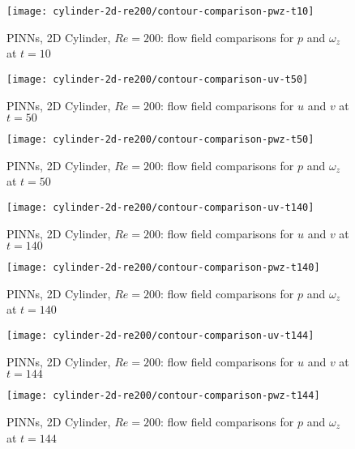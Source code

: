 \begin{figure}[hbt!]
    \texttt{[image: cylinder-2d-re200/contour-comparison-pwz-t10]}
    \caption{PINNs, 2D Cylinder, $Re=200$: flow field comparisons for $p$ and $\omega_z$ at $t=10$}
    \label{fig:cylinder-re200-contour-pwz-t10}
\end{figure}

\begin{figure}[hbt!]
    \texttt{[image: cylinder-2d-re200/contour-comparison-uv-t50]}
    \caption{PINNs, 2D Cylinder, $Re=200$: flow field comparisons for $u$ and $v$ at $t=50$}
    \label{fig:cylinder-re200-contour-uv-t50}
\end{figure}

\begin{figure}[hbt!]
    \texttt{[image: cylinder-2d-re200/contour-comparison-pwz-t50]}
    \caption{PINNs, 2D Cylinder, $Re=200$: flow field comparisons for $p$ and $\omega_z$ at $t=50$}
    \label{fig:cylinder-re200-contour-pwz-t50}
\end{figure}

\begin{figure}[hbt!]
    \texttt{[image: cylinder-2d-re200/contour-comparison-uv-t140]}
    \caption{PINNs, 2D Cylinder, $Re=200$: flow field comparisons for $u$ and $v$ at $t=140$}
    \label{fig:cylinder-re200-contour-uv-t140}
\end{figure}

\begin{figure}[hbt!]
    \texttt{[image: cylinder-2d-re200/contour-comparison-pwz-t140]}
    \caption{PINNs, 2D Cylinder, $Re=200$: flow field comparisons for $p$ and $\omega_z$ at $t=140$}
    \label{fig:cylinder-re200-contour-pwz-t140}
\end{figure}

\begin{figure}[hbt!]
    \texttt{[image: cylinder-2d-re200/contour-comparison-uv-t144]}
    \caption{PINNs, 2D Cylinder, $Re=200$: flow field comparisons for $u$ and $v$ at $t=144$}
    \label{fig:cylinder-re200-contour-uv-t144}
\end{figure}

\begin{figure}[hbt!]
    \texttt{[image: cylinder-2d-re200/contour-comparison-pwz-t144]}
    \caption{PINNs, 2D Cylinder, $Re=200$: flow field comparisons for $p$ and $\omega_z$ at $t=144$}
    \label{fig:cylinder-re200-contour-pwz-t144}
\end{figure}

